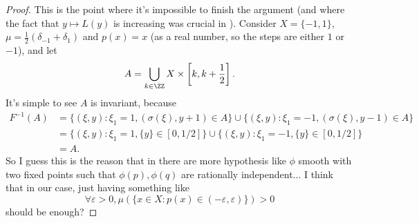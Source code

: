 \documentclass[b5paper]{article}
\begin{document}
\begin{proof}
  This is the point where it's impossible to finish the argument (and where the fact that \(y\mapsto L(y)\) is increasing was crucial in \cite{bonifantSchwarzianDerivativesCylinder2008}).
  Consider \(X = \{ -1,1 \}\), \(\mu = \frac{1}{2}(\delta_{-1} + \delta_1)\) and \(p(x) = x\) (as a real number, so the steps are either \(1\) or \(-1\)), and let
  \begin{equation*}
    A = \bigcup_{k \in \ZZ} X \times \left[k, k + \frac{1}{2}\right].
  \end{equation*}
  It's simple to see \(A\) is invariant, because
  \begin{align*}
    F ^{-1}(A)
    &= \{ (\xi,y) : \xi_1 = 1, (\sigma(\xi), y + 1) \in A \} \cup  \{ (\xi,y) : \xi_1 = -1, (\sigma(\xi),y - 1) \in A \}\\
    &= \{ (\xi,y) : \xi_1 = 1, \{y\} \in [0,1/2] \} \cup  \{ (\xi,y) : \xi_1 = -1, \{ y \} \in [0,1/2] \}\\
    &= A.
  \end{align*}
  So I guess this is the reason that in \cite{crovisierEmpiricalMeasuresPartially2020} there are more hypothesis like \(\phi\) smooth with two fixed points such that \(\phi(p), \phi(q)\) are rationally independent... I think that in our case, just having something like
  \begin{equation*}
    \forall \varepsilon > 0, \mu(\{ x \in X : p(x) \in (-\varepsilon, \varepsilon) \}) > 0
  \end{equation*}
  should be enough?
\end{proof}

\printbibliography
\end{document}
